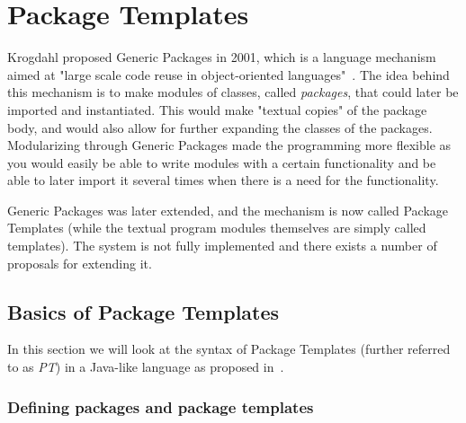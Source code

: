 \section{Package Templates}\label{sec:package-templates}


Krogdahl proposed Generic Packages in 2001, which is a language mechanism aimed at "large scale code reuse in object-oriented languages"~\cite{krogdahl:GP}.
The idea behind this mechanism is to make modules of classes, called \textit{packages}, that could later be imported and instantiated.
This would make "textual copies" of the package body, and would also allow for further expanding the classes of the packages.
Modularizing through Generic Packages made the programming more flexible as you would easily be able to write modules with a certain functionality and be able to later import it several times when there is a need for the functionality.

Generic Packages was later extended, and the mechanism is now called Package Templates (while the textual program modules themselves are simply called templates).
The system is not fully implemented and there exists a number of proposals for extending it.

\subsection{Basics of Package Templates}\label{subsec:basics-of-package-templates}

In this section we will look at the syntax of Package Templates (further referred to as \emph{PT}) in a Java-like language as proposed in~\cite{jot}.

\subsubsection{Defining packages and package templates}

